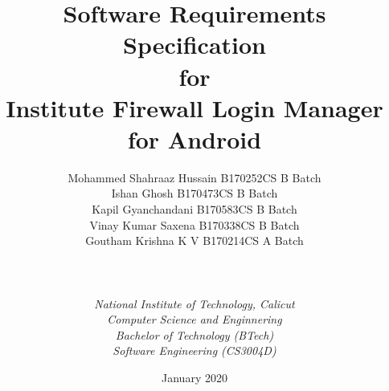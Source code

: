
\usepackage{graphicx}

\titleformat{\chapter}[display]
  {\normalfont\bfseries}{}{0pt}{\Huge}

\def\Company{Institution}
\def\Institute{\textit{National Institute of Technology, Calicut}}
\def\Course{\textit{Computer Science and Enginnering}}
\def\Module{\textit{Bachelor of Technology (BTech)}}
\def\Docent{\textit{Software Engineering (CS3004D)}}
\def\Assistant{\textit{Somone}}

\def\BoldTitle{Software Requirements Specification}

\def\Subtitle{for \\ Institute Firewall Login Manager for Android \\}
\def\Authors{
Mohammed Shahraaz Hussain B170252CS B Batch \\
Ishan Ghosh B170473CS B Batch \\
Kapil Gyanchandani B170583CS B Batch\\
Vinay Kumar Saxena  B170338CS B Batch\\
Goutham Krishna K V B170214CS A Batch\\
} 

\title{\textbf{\BoldTitle}\\\Subtitle}
\author{\Authors \\ \\ \\ \Institute\\ \Course\\ \Module\\ \Docent\\} %
\date{January 2020}

